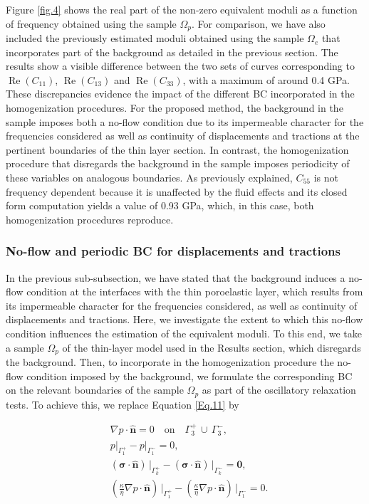 \documentclass[draft]{agujournal2019}
\renewcommand{\Re}{\operatorname{Re} }
\begin{document}
Figure \ref{fig.4} shows the real part of the non-zero equivalent moduli as a function of frequency obtained using the sample $\Omega_p$. For comparison, we have also included the previously estimated moduli obtained using the sample $\Omega_e$ that incorporates part of the background as detailed in the previous section. The results show  a visible difference between the two sets of curves corresponding to $\Re(C_{11})$, $\Re(C_{13})$ and $\Re(C_{33})$, with a maximum of around 0.4 GPa. These discrepancies evidence the impact of the different BC incorporated in the homogenization procedures. For the proposed method, the  background in the sample imposes both a no-flow condition due to its impermeable character for the frequencies considered as well as continuity of displacements and tractions at the pertinent boundaries of the thin layer section. In contrast, the  homogenization procedure that disregards the background in the sample imposes periodicity of these variables on analogous boundaries. 
As previously explained, $C_{55}$ is not frequency dependent because it is unaffected by the fluid effects and its closed form computation yields a value of 0.93 GPa, which, in this case, both homogenization procedures reproduce.

\subsubsection{No-flow and periodic BC for displacements and tractions} 
In the previous sub-subsection, we have stated that the background induces a no-flow condition at the interfaces with the thin poroelastic layer, which results from its impermeable character for the frequencies considered, as well as continuity of displacements and tractions. Here, we investigate the extent to which this no-flow condition influences the estimation of the equivalent moduli. To this end, we  take a sample $\Omega_p$ of the thin-layer model used in the Results section, which disregards the background. Then, to incorporate in the homogenization procedure the no-flow condition imposed by the background, we formulate the corresponding BC on the relevant boundaries of the sample $\Omega_p$ as part of the  oscillatory relaxation tests. To achieve this, we replace Equation \ref{Eq.11} by
\begin{linenomath*}
\begin{equation}\label{Eq.14}
\begin{split}
& \nabla p \cdot \bm{\hat n}  = 0 \quad \text{on}\quad \Gamma_3^+ \, \cup \, \Gamma_3^-,\\
& p\vert_{\Gamma_1^+}-p\vert_{\Gamma_1^-} =0, \\
& \left(\bm{\sigma}\cdot \bm{\hat n} \right)\, \vert_{\Gamma_k^+}-\left(\bm{\sigma}\cdot \bm{\hat n} \right)\, \vert_{\Gamma_k^-} = \bm{0},\\
&\left( \frac{\kappa}{\eta} \nabla p \cdot \bm{\hat n} \right) \, \vert_{\Gamma_1^+} -\left( \frac{\kappa}{\eta} \nabla p \cdot \bm{\hat n} \right) \, \vert_{\Gamma_1^-} = 0.
\end{split}
\end{equation}
\end{linenomath*}
\end{document}
